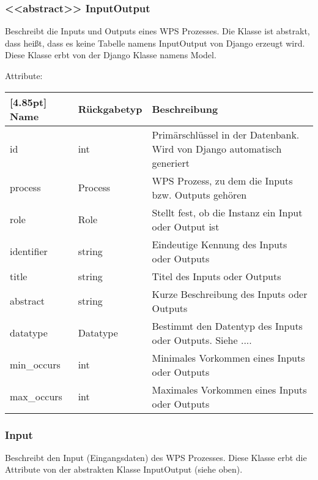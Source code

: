 		\subsubsection{<<abstract>> InputOutput}
			Beschreibt die Inputs und Outputs eines WPS Prozesses. Die Klasse ist abstrakt, dass heißt, dass es keine Tabelle namens InputOutput von Django erzeugt wird. \newline
			Diese Klasse erbt von der Django Klasse namens \glqq Model\grqq .\newline
			
			Attribute:
			\begin{center}
				\setlength\tabcolsep{5pt}
				\renewcommand{\arraystretch}{1.5}
				
				\begin{tabularx}{\textwidth}{|l|l|X|}
					\hline
					\rowcolor[gray]{0.75}[4.85pt]
					Name & Rückgabetyp & Beschreibung \\ \hline 
					id & int & Primärschlüssel in der Datenbank. Wird von Django automatisch generiert \\ \hline
					process & Process & WPS Prozess, zu dem die Inputs bzw. Outputs gehören \\ \hline
					role & Role & Stellt fest, ob die Instanz ein Input oder Output ist \\ \hline
					identifier & string & Eindeutige Kennung des Inputs oder Outputs \\ \hline
					title & string & Titel des Inputs oder Outputs \\ \hline
					abstract & string & Kurze Beschreibung des Inputs oder Outputs \\ \hline
					datatype & Datatype & Bestimmt den Datentyp des Inputs oder Outputs. 
					Siehe .... \\ \hline
					min\_occurs & int & Minimales Vorkommen eines Inputs oder Outputs \\ \hline
					max\_occurs & int & Maximales Vorkommen eines Inputs oder Outputs \\ \hline
				\end{tabularx}
			\end{center}
			

\newpage

		\subsubsection{Input}
			Beschreibt den Input (Eingangsdaten) des WPS Prozesses. \newline
			Diese Klasse erbt die Attribute von der abstrakten Klasse InputOutput (siehe oben).

